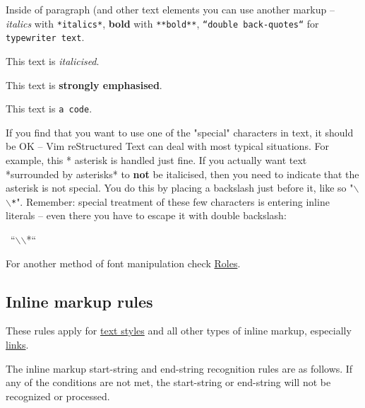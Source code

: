 \documentclass[12pt]{article}
\begin{document}
Inside of paragraph (and other text elements you can use another markup
-- \emph{italics} with \texttt{*italics*}, \textbf{bold} with \texttt{**bold**},
\texttt{``double back-quotes``} for \texttt{typewriter text}.

This text is \emph{italicised}.

This text is \textbf{strongly emphasised}.

This text is \texttt{a code}.

If you find that you want to use one of the "special" characters in
text, it should be OK -- Vim reStructured Text can deal with most typical situations.
For example, this * asterisk is handled just fine. If you actually
want text *surrounded by asterisks* to \textbf{not} be italicised, then
you need to indicate that the asterisk is not special. You do this by
placing a backslash just before it, like so "\texttt{$\backslash$$\backslash$*}". Remember: special
treatment of these few characters is entering inline literals -- even
there you have to escape it with double backslash:

\begin{ttfamily}\begin{flushleft}
\mbox{~``$\backslash$$\backslash$*``}\\
\end{flushleft}\end{ttfamily}

For another method of font manipulation check \href{\#lroles}{Roles}.

\hypertarget{linline-markup-rules}{}
\subsection{Inline markup rules}

These rules apply for \href{\#ltext-styles}{text styles} and all other types of inline markup,
especially \href{\#llinks}{links}.

The inline markup start-string and end-string recognition rules are as
follows. If any of the conditions are not met, the start-string or
end-string will not be recognized or processed.
\end{document}
